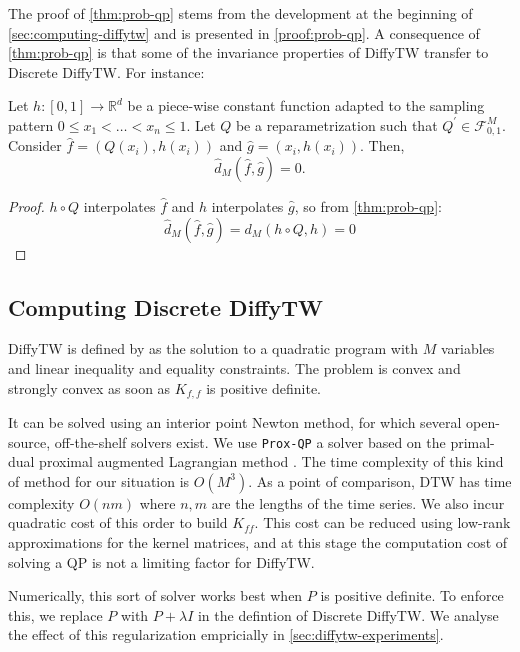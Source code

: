 The proof of \cref{thm:prob-qp} stems from the development at the beginning of \cref{sec:computing-diffytw} and is presented in \cref{proof:prob-qp}. A consequence of \cref{thm:prob-qp} is that some of the invariance properties of DiffyTW transfer to Discrete DiffyTW. For instance:

\begin{corollary}\label{corollary:discrete-invariance}
Let $h: [0, 1] \to \mathbb R^d$ be a piece-wise constant function adapted to the sampling pattern $0 \leq x_1 < \ldots < x_n \leq 1$. Let $Q$ be a reparametrization such that $Q^\prime \in \mathcal F_{0,1}^M$. Consider $\hat f = (Q(x_i), h(x_i))$ and $\hat g = (x_i, h(x_i))$. Then,
\begin{equation}
    \hat d_M(\hat f, \hat g) = 0.
\end{equation}
\end{corollary}
\begin{proof}
$h \circ Q$ interpolates $\hat f$ and $h$ interpolates $\hat g$, so from \cref{thm:prob-qp}:
\begin{equation}
    \hat d_M(\hat f, \hat g) = d_M(h\circ Q, h) = 0
\end{equation}
\end{proof}


\subsection{Computing Discrete DiffyTW}\label{sec:solving-qp}

DiffyTW is defined by  as the solution to a quadratic program with $M$ variables and linear inequality and equality constraints. The problem is convex and strongly convex as soon as $K_{f,f}$ is positive definite.

It can be solved using an interior point Newton method, for which several open-source, off-the-shelf solvers exist. We use \texttt{Prox-QP} a solver based on the primal-dual proximal augmented Lagrangian method \citep{fabian}. The time complexity of this kind of method for our situation is $O(M^3)$. As a point of comparison, DTW has time complexity $O(nm)$ where $n, m$ are the lengths of the time series. We also incur quadratic cost of this order to build $K_{ff}$. This cost can be reduced using low-rank approximations for the kernel matrices, and at this stage the computation cost of solving a QP is not a limiting factor for DiffyTW.

Numerically, this sort of solver works best when $P$ is positive definite. To enforce this, we replace $P$ with $P + \lambda I$ in the defintion of Discrete DiffyTW. We analyse the effect of this regularization empricially in \cref{sec:diffytw-experiments}.

